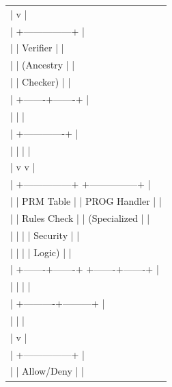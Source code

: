\documentclass[conference]{IEEEtran}
\begin{document}
\begin{figure}[htbp]
{{{\begin{tabular}{l}
|          v                                                                  | \\
|  +---------------+                                                          | \\
|  |   Verifier    |                                                          | \\
|  |  (Ancestry    |                                                          | \\
|  |   Checker)    |                                                          | \\
|  +-------+-------+                                                          | \\
|          |                                                                  | \\
|          +-------------+                                                    | \\
|          |             |                                                    | \\
|          v             v                                                    | \\
|  +---------------+    +---------------+                                     | \\
|  | PRM Table     |    | PROG Handler  |                                     | \\
|  | Rules Check   |    | (Specialized  |                                     | \\
|  |               |    |  Security     |                                     | \\
|  |               |    |  Logic)       |                                     | \\
|  +-------+-------+    +-------+-------+                                     | \\
|          |                    |                                             | \\
|          +----------+---------+                                             | \\
|                     |                                                       | \\
|                     v                                                       | \\
|             +---------------+                                               | \\
|             |  Allow/Deny   |                                               | \\

\end{tabular}}}}
\end{figure}
\end{document}
